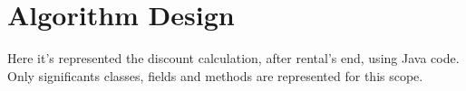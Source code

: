 \chapter{Algorithm Design}

Here it's represented the discount calculation, after rental's end, using Java code. Only significants classes, fields and methods are represented for this scope.
\\
\\


\newpage

\newpage

\newpage

\newpage

\newpage
